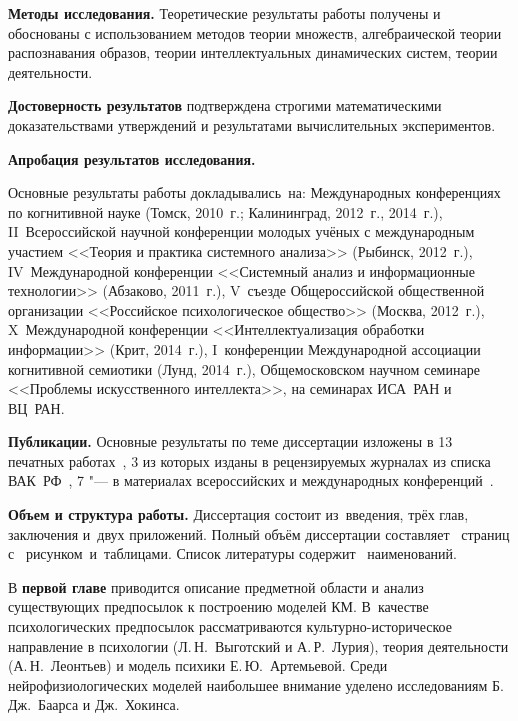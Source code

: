 \textbf{Методы исследования.} Теоретические результаты работы получены и обоснованы с использованием методов теории множеств, алгебраической теории распознавания образов, теории интеллектуальных динамических систем, теории деятельности.

\textbf{Достоверность результатов} подтверждена строгими математическими доказательствами утверждений и результатами вычислительных экспериментов.

\textbf{Апробация результатов исследования.}

Основные результаты работы докладывались~на: Международных конференциях по когнитивной науке (Томск, 2010~г.; Калининград, 2012~г., 2014~г.), II~Всероссийской научной конференции молодых учёных с международным участием <<Теория и практика системного анализа>> (Рыбинск, 2012~г.), IV~Международной конференции <<Системный анализ и информационные технологии>> (Абзаково, 2011~г.), V~съезде Общероссийской общественной организации <<Российское психологическое общество>> (Москва, 2012~г.), X~Международной конференции <<Интеллектуализация обработки информации>> (Крит, 2014~г.), I~конференции Международной ассоциации когнитивной семиотики (Лунд, 2014~г.), Общемосковском научном семинаре <<Проблемы искусственного интеллекта>>, на семинарах ИСА~РАН и ВЦ~РАН.

\textbf{Публикации.} Основные результаты по теме диссертации изложены в 13 печатных работах~\cite{PanovA2011,PanovA2012a,PanovA2012b,PanovA2012c,PanovA2013b,PanovA2014a,PanovT2010b,PanovT2012a,PanovT2012b,PanovT2013,PanovT2014a,PanovT2014b,PanovA2014c,PanovAE2014a}, 3 из которых изданы в рецензируемых журналах из списка ВАК~РФ~\cite{PanovA2012c,PanovA2013b,PanovA2014a}, 7 "--- в материалах всероссийских и международных конференций~\cite{PanovA2011,PanovA2012a,PanovA2012b,PanovT2010b,PanovT2012b,PanovT2014a,PanovT2014b}.

\textbf{Объем и структура работы.} Диссертация состоит из~введения, трёх глав, заключения и~двух приложений. Полный объём диссертации составляет \totalpages\ страниц с \totalfigures\ рисунком\iftotaltables\ и\totaltables\ таблицами\fi. Список литературы содержит \totalcitnums\ наименований.

В \textbf{первой главе} приводится описание предметной области и анализ существующих предпосылок к построению моделей КМ. В~качестве психологических предпосылок рассматриваются культурно-историческое направление в психологии (Л.\,Н.~Выготский и А.\,Р.~Лурия), теория деятельности (А.\,Н.~Леонтьев) и модель психики Е.\,Ю.~Артемьевой. Среди нейрофизиологических моделей наибольшее внимание уделено исследованиям Б.\,Дж.~Баарса и Дж.~Хокинса.

